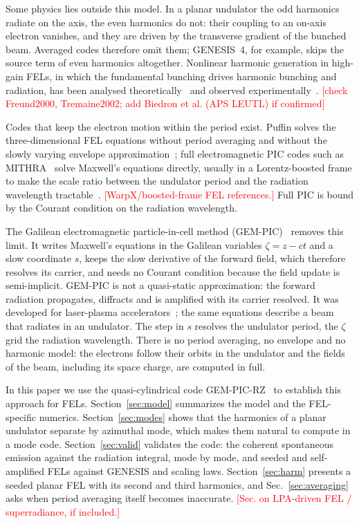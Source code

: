 \documentclass[aps,prab,reprint,floatfix,superscriptaddress,amsmath,amssymb]{revtex4-2}
\newcommand{\todo}[1]{\textcolor{red}{[#1]}}
\begin{document}
Some physics lies outside this model. In a planar undulator the odd harmonics radiate on the axis, the even harmonics do not: their coupling to an on-axis electron vanishes, and they are driven by the transverse gradient of the bunched beam. Averaged codes therefore omit them; GENESIS~4, for example, skips the source term of even harmonics altogether. Nonlinear harmonic generation in high-gain FELs, in which the fundamental bunching drives harmonic bunching and radiation, has been analysed theoretically~\cite{Huang2000,Freund2000} and observed experimentally~\cite{Tremaine2002}. \todo{check Freund2000, Tremaine2002; add Biedron et al. (APS LEUTL) if confirmed}

Codes that keep the electron motion within the period exist. Puffin solves the three-dimensional FEL equations without period averaging and without the slowly varying envelope approximation~\cite{Campbell2012}; full electromagnetic PIC codes such as MITHRA~\cite{Fallahi2018} solve Maxwell's equations directly, usually in a Lorentz-boosted frame to make the scale ratio between the undulator period and the radiation wavelength tractable~\cite{Vay2007}. \todo{WarpX/boosted-frame FEL references.} Full PIC is bound by the Courant condition on the radiation wavelength.

The Galilean electromagnetic particle-in-cell method (GEM-PIC)~\cite{GEMPIC} removes this limit. It writes Maxwell's equations in the Galilean variables $\zeta = z - ct$ and a slow coordinate $s$, keeps the slow derivative of the forward field, which therefore resolves its carrier, and needs no Courant condition because the field update is semi-implicit. GEM-PIC is not a quasi-static approximation: the forward radiation propagates, diffracts and is amplified with its carrier resolved. It was developed for laser-plasma accelerators~\cite{GEMPIC,GEMPICRZ_paper}; the same equations describe a beam that radiates in an undulator. The step in $s$ resolves the undulator period, the $\zeta$ grid the radiation wavelength. There is no period averaging, no envelope and no harmonic model: the electrons follow their orbits in the undulator and the fields of the beam, including its space charge, are computed in full.

In this paper we use the quasi-cylindrical code GEM-PIC-RZ~\cite{GEMPICRZ_paper,GEMPICRZ} to establish this approach for FELs. Section~\ref{sec:model} summarizes the model and the FEL-specific numerics. Section~\ref{sec:modes} shows that the harmonics of a planar undulator separate by azimuthal mode, which makes them natural to compute in a mode code. Section~\ref{sec:valid} validates the code: the coherent spontaneous emission against the radiation integral, mode by mode, and seeded and self-amplified FELs against GENESIS and scaling laws. Section~\ref{sec:harm} presents a seeded planar FEL with its second and third harmonics, and Sec.~\ref{sec:averaging} asks when period averaging itself becomes inaccurate. \todo{Sec. on LPA-driven FEL / superradiance, if included.}
\end{document}
